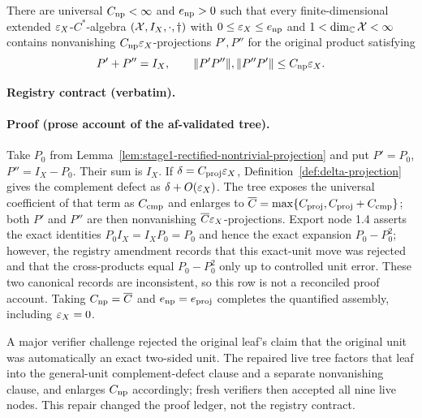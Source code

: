 \begin{lemma}\label{lem:stage1-original-complementary-pair}
There are universal $C_{\rm np}<\infty$ and $e_{\rm np}>0$ such that every finite-dimensional
extended $\varepsilon_X$-$C^*$-algebra $(\mathcal X,I_X,\cdot,\dagger)$ with
$0\le\varepsilon_X\le e_{\rm np}$ and $1<\dim_{\mathbb C}\mathcal X<\infty$ contains nonvanishing
$C_{\rm np}\varepsilon_X$-projections $P',P''$ for the original product satisfying
\[
 P'+P''=I_X,\qquad \lVert P'P''\rVert,\lVert P''P'\rVert\le C_{\rm np}\varepsilon_X.
\]
\end{lemma}

\noindent\textbf{Registry contract (verbatim).} 

\paragraph{Proof (prose account of the af-validated tree).}
Take $P_0$ from Lemma~\ref{lem:stage1-rectified-nontrivial-projection} and put
$P'=P_0$, $P''=I_X-P_0$.  Their sum is $I_X$.  If
$\delta=C_{\rm proj}\varepsilon_X$, Definition~\ref{def:delta-projection} gives the complement
defect as $\delta+O(\varepsilon_X)$.  The tree exposes the universal coefficient of that term as
$C_{\rm cmp}$ and enlarges to
$\overline C=\max\{C_{\rm proj},C_{\rm proj}+C_{\rm cmp}\}$; both $P'$ and $P''$ are then
nonvanishing $\overline C\varepsilon_X$-projections.  Export node 1.4 asserts the exact identities $P_0I_X=I_XP_0=P_0$ and hence the exact expansion $P_0-P_0^2$; however, the registry amendment records that this exact-unit move was rejected and that the cross-products equal $P_0-P_0^2$ only up to controlled unit error.  These two canonical records are inconsistent, so this row is not a reconciled proof account.  Taking $C_{\rm np}=\overline C$ and
$e_{\rm np}=e_{\rm proj}$ completes the quantified assembly, including $\varepsilon_X=0$.

A major verifier challenge rejected the original leaf's claim that the original unit was
automatically an exact two-sided unit.  The repaired live tree factors that leaf into the
general-unit complement-defect clause and a separate nonvanishing clause, and enlarges
$C_{\rm np}$ accordingly; fresh verifiers then accepted all nine live nodes.  This repair
changed the proof ledger, not the registry contract.

